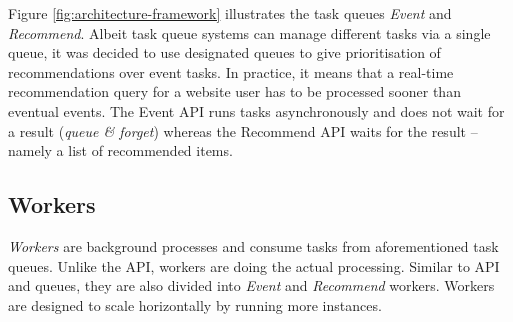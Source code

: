 Figure \ref{fig:architecture-framework} illustrates the task queues \emph{Event} and \emph{Recommend}. Albeit task queue systems can manage different tasks via a single queue, it was decided to use designated queues to give prioritisation of recommendations over event tasks. In practice, it means that a real-time recommendation query for a website user has to be processed sooner than eventual events. The Event API runs tasks asynchronously and does not wait for a result (\emph{queue \& forget}) whereas the Recommend API waits for the result -- namely a list of recommended items.

\subsection{Workers}

\emph{Workers} are background processes and consume tasks from aforementioned task queues. Unlike the API, workers are doing the actual processing. Similar to API and queues, they are also divided into \emph{Event} and \emph{Recommend} workers. Workers are designed to scale horizontally by running more instances.